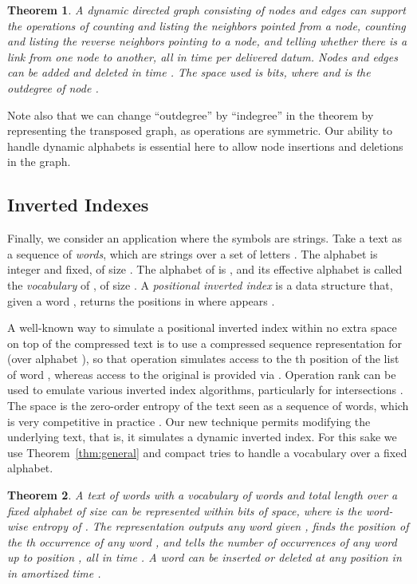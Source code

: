 \documentclass[11pt]{article}
\newtheorem{theorem}{Theorem}
\begin{document}
\begin{theorem}
A dynamic directed graph consisting of  nodes and  edges 
can support the operations of counting and listing the neighbors pointed from 
a node, counting and listing the reverse neighbors pointing to a node, and 
telling whether there is a link from one node to another, all in time 
 per delivered datum. Nodes and edges 
can be added and deleted in time 
. The space used is 
 bits, 
where 
and  is the outdegree of node .
\end{theorem}

Note also that we can change ``outdegree'' by ``indegree'' in the theorem by
representing the transposed graph, as operations are symmetric. Our ability
to handle dynamic alphabets is essential here to allow node insertions and
deletions in the graph.

\subsection{Inverted Indexes}

Finally, we consider an application where the symbols are strings. Take a
text  as a sequence of  {\em words}, which are strings over a set of
letters . The alphabet  is integer and fixed, of size . 
The alphabet of  is , and its effective
alphabet is called the {\em vocabulary}  of , of size .
A {\em positional inverted index} is a data structure that, given a word
, returns the positions in  where  appears \cite{BYRN11}.

A well-known way to simulate a positional inverted index within no extra space
on top of the compressed text is to use a compressed sequence representation 
for  (over alphabet ), so that operation  simulates
access to the th position of the list of word , whereas access to the
original  is provided via . Operation rank can be used to 
emulate various inverted index algorithms, particularly for intersections
\cite{BN09}. The space is the zero-order entropy of the text seen as a
sequence of words, which is very competitive in practice \cite{BYRN11}. 
Our new technique
permits modifying the underlying text, that is, it simulates a dynamic
inverted index. For this sake we use Theorem~\ref{thm:general}
and compact tries to handle a vocabulary over a fixed alphabet.

\begin{theorem}
A text of  words with a vocabulary of  words and total length 
over a fixed alphabet  of size  can be represented 
within 
bits of space, where  is
the word-wise entropy of .
The representation outputs any word 
given , finds the position of the th occurrence of any word ,
and tells the number of occurrences of any word  up to position , all
in time . A word  can be inserted or deleted at 
any position in  in amortized time .
\end{theorem}
\end{document}

